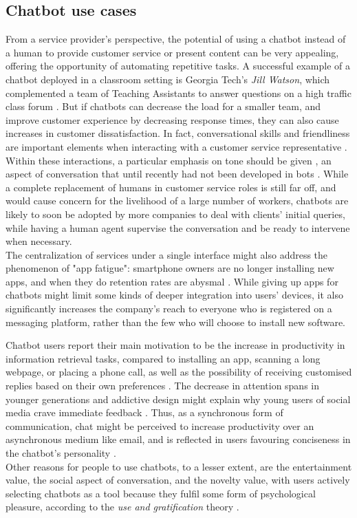 \subsection{Chatbot use cases}
From a service provider's perspective, the potential of using a chatbot instead of a human to provide customer service or present content can be very appealing, offering the opportunity of automating repetitive tasks. A successful example of a chatbot deployed in a classroom setting is Georgia Tech's \textit{Jill Watson}, which complemented a team of Teaching Assistants to answer questions on a high traffic class forum \cite{Eicher2016}. But if chatbots can decrease the load for a smaller team, and improve customer experience by decreasing response times, they can also cause increases in customer dissatisfaction. In fact, conversational skills and friendliness are important elements when interacting with a customer service representative \cite{Kang2013}. Within these interactions, a particular emphasis on tone should be given \cite{morris1988many}, an aspect of conversation that until recently had not been developed in bots \cite{Hu2018}. While a complete replacement of humans in customer service roles is still far off, and would cause concern for the livelihood of a large number of workers, chatbots are likely to soon be adopted by more companies to deal with clients' initial queries, while having a human agent supervise the conversation and be ready to intervene when necessary. \\
The centralization of services under a single interface might also address the phenomenon of "app fatigue": smartphone owners are no longer installing new apps, and when they do retention rates are abysmal \cite{appfatigue}. While giving up apps for chatbots might limit some kinds of deeper integration into users' devices, it also significantly increases the company's reach to everyone who is registered on a messaging platform, rather than the few who will choose to install new software. 

Chatbot users report their main motivation to be the increase in productivity in information retrieval tasks, compared to installing an app, scanning a long webpage, or placing a phone call, as well as the possibility of receiving customised replies based on their own preferences \cite{10.1007/978-3-319-70284-1_30}. The decrease in attention spans in younger generations \cite{Wilmer2017} and addictive design might explain why young users of social media crave immediate feedback \cite{brandtzaeg2016should}. Thus, as a synchronous form of communication, chat might be perceived to increase productivity over an asynchronous medium like email, and is reflected in users favouring conciseness in the chatbot's personality \cite{10.1007/978-3-319-67744-6_28}. \\
Other reasons for people to use chatbots, to a lesser extent, are the entertainment value, the social aspect of conversation, and the novelty value, with users actively selecting chatbots as a tool because they fulfil some form of psychological pleasure, according to the \textit{use and gratification} theory \cite{10.1007/978-3-319-70284-1_30}.

